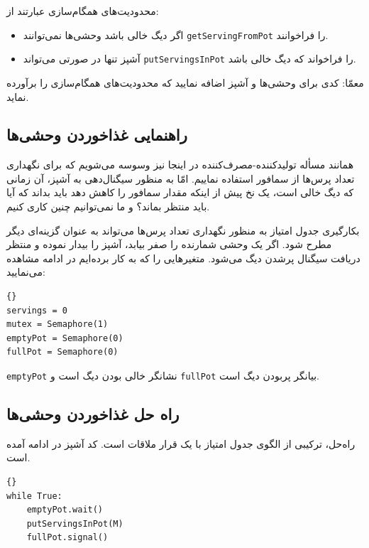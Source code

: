 \documentclass{book}
\newcommand{\clearemptydoublepage}{\newpage\cleardoublepage}
\begin{document}
    محدودیت‌های همگام‌سازی عبارتند از:

\begin{itemize}

\item 
    اگر دیگ خالی باشد وحشی‌ها نمی‌توانند {\tt getServingFromPot}  را فراخوانند. 

\item 
    آشپز تنها در صورتی می‌تواند  {\tt putServingsInPot} را فراخواند که دیگ خالی باشد. 

\end{itemize}

    معمّا: کدی برای وحشی‌ها و آشپز اضافه نمایید که محدودیت‌های همگام‌سازی را برآورده نماید. 

\clearemptydoublepage
\subsection{راهنمایی غذاخوردن وحشی‌ها}

    همانند مسأله تولیدکننده-مصرف‌کننده  در اینجا نیز وسوسه می‌شویم که برای نگهداری تعداد پرس‌ها از سمافور استفاده نماییم. 
    امّا به منظور سیگنال‌دهی به آشپز،‌ آن زمانی که دیگ خالی است، 
    یک نخ پیش از اینکه مقدار سمافور را کاهش دهد باید بداند که آیا باید منتظر بماند؟ و 
    ما نمی‌توانیم چنین کاری کنیم. 

    بکارگیری جدول امتیاز به منظور نگهداری تعداد پرس‌ها می‌تواند به عنوان گزینه‌ای دیگر مطرح شود.
    اگر یک وحشی شمارنده را صفر بیابد، آشپز را بیدار نموده و منتظر دریافت سیگنال پرشدن دیگ می‌شود. 
    متغیرهایی را که به کار برده‌ایم در ادامه مشاهده می‌نمایید:

\begin{latin}
\begin{lstlisting}[title={Dining Savages hint}]{}
servings = 0
mutex = Semaphore(1)
emptyPot = Semaphore(0)
fullPot = Semaphore(0)
\end{lstlisting}
\end{latin}

    {\tt emptyPot} نشانگر خالی بودن دیگ است و {\tt fullPot} بیانگر پربودن دیگ است. 

\clearemptydoublepage
\subsection{راه‌ حل غذاخوردن وحشی‌ها}

    راه‌حل،  ترکیبی از الگوی جدول امتیاز با یک قرار ملاقات است.  کد آشپز در ادامه آمده است. 

\begin{latin}
\begin{lstlisting}[title=\rl{راه‌‌حل غذاخوردن وحشی‌ها (آشپز)}]{}
while True:
    emptyPot.wait()
    putServingsInPot(M)
    fullPot.signal()
\end{lstlisting}
\end{latin}
\end{document}
